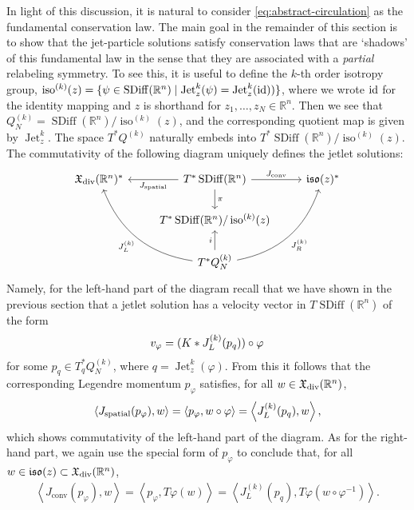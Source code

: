 \documentclass[12pt]{amsart}
\newcommand{\R}{\ensuremath{\mathbb{R}}}
\DeclareMathOperator{\SDiff}{SDiff}
\DeclareMathOperator{\Jet}{Jet}
\DeclareMathOperator{\iso}{iso}
\begin{document}
In light of this discussion, it is natural to consider \eqref{eq:abstract-circulation} as the  fundamental conservation law. The main goal in the remainder of this section is to show that the jet-particle solutions satisfy conservation laws that are `shadows' of this fundamental law in the sense that they are associated with a \emph{partial} relabeling symmetry. To see this, it is useful to define the $k$-th order isotropy group,
$\iso^{(k)}(z) = \{ \psi \in \SDiff(\R^n) \mid \Jet^{k}_z( \psi) = \Jet^k_z (\rm{id})) \}$, where we wrote $\rm{id}$ for the identity mapping and $z$ is shorthand for $z_1, \ldots, z_N \in \mathbb{R}^n$.
Then we see that $Q^{(k)}_N = \SDiff(\R^n) / \iso^{(k)}(z)$, and the corresponding quotient map is given by $\Jet_z^k$.  
 The space $T^*Q^{(k)}$ naturally embeds into $T^*\SDiff(\R^n) / \iso^{(k)}(z)$.  The commutativity of the following diagram uniquely defines the jetlet solutions:
  \begin{equation}
 \begin{tikzcd}
   \mathfrak{X}_{\rm div}(\R^n)^* & \ar[l,"J_\text{spatial}"] T^*\SDiff(\R^n) \ar[r,"J_\text{conv}"] \ar[d,"\pi"] & \mathfrak{iso}(z)^* \\
   & T^*\SDiff(\R^n) / \iso^{(k)}(z) & \\
   & T^*Q^{(k)}_N \uar{i} \ar[uur,"J_R^{(k)}"',bend right = 30] \ar[uul,"J_L^{(k)}",bend left = 30] &
 \end{tikzcd}
\end{equation}
  Namely, for the left-hand part of the diagram recall that we have shown in the previous section that a jetlet solution has a velocity vector in $T \SDiff(\R^n)$ of the form \begin{align} v_{\varphi} = (K * J_L^{(k)}(p_q)) \circ \varphi \notag \end{align} for some $p_q \in T^*_q Q^{(k)}_N$, where $q = \Jet^k_z(\varphi)$. From this it follows that the corresponding Legendre momentum $p_\varphi$ satisfies, for all $ w \in \mathfrak{X}_{\rm div}(\R^n)$,
  \begin{align}
  \left< J_\text{spatial}(p_\varphi), w\right> = \left< p_\varphi, w \circ \varphi \right> = \left< J_L^{(k)}(p_q), w \right>, \notag
  \end{align}
  which shows commutativity of the left-hand part of the diagram. As for the right-hand part, we again use the special form of $p_\varphi$ to conclude that, for all $ w \in \mathfrak{iso}(z) \subset \mathfrak{X}_{\rm div}(\R^n)$,
 \begin{align}
 	\left<J_\text{conv}(p_\varphi), w\right> = \left<p_\varphi, T\varphi  (w) \right> = \left<J_L^{(k)}(p_q),  T\varphi (w \circ \varphi^{-1}) \right>. \label{compare_1}
 \end{align}
\end{document}
